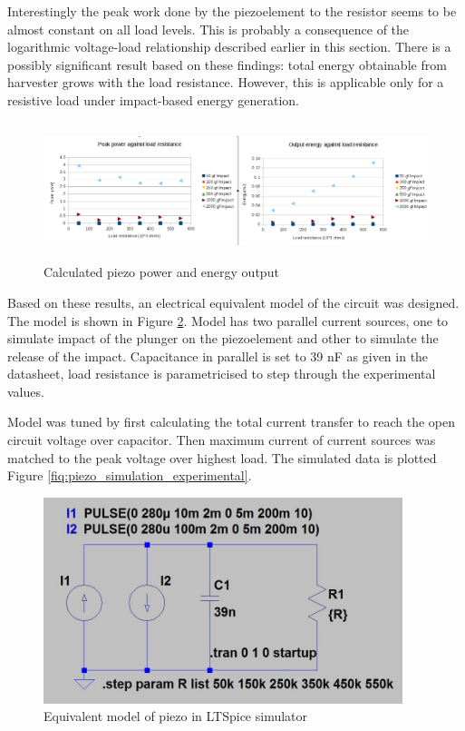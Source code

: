  Interestingly the peak work done by the piezoelement to the resistor seems to be almost constant on all load levels. This is probably a consequence of the logarithmic voltage-load relationship described earlier in this section. There is a possibly significant result based on these findings: total energy obtainable from harvester grows with the load resistance. However, this is applicable only for a resistive load under impact-based energy generation.
 
 \begin{figure}[htb]
  \begin{center}
  \includegraphics[height=4cm]{images/own_measurement/piezo_power}
  \end{center}
  \caption{Calculated piezo power and energy output}
  \label{fig:piezo_power_energy}
\end{figure}

Based on these results, an electrical equivalent model of the circuit was designed. The model is shown in Figure \ref{fig:piezo_ltspice_equivalent}. Model has two parallel current sources, one to simulate impact of the plunger on the piezoelement and other to simulate the release of the impact. Capacitance in parallel is set to 39 nF as given in the datasheet, load resistance is parametricised to step through the experimental values.

Model was tuned by first calculating the total current transfer to reach the open circuit voltage over capacitor. Then maximum current of current sources was matched to the peak voltage over highest load.
The simulated data is plotted Figure \ref{fiq:piezo_simulation_experimental}.

 \begin{figure}[htb]
  \begin{center}
  \includegraphics[height=6cm]{images/own_dwg/ltspice_piezo}
  \end{center}
  \caption{Equivalent model of piezo in LTSpice simulator}
  \label{fig:piezo_ltspice_equivalent}
\end{figure}


